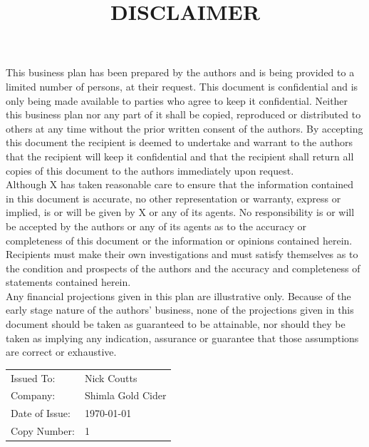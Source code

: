 \documentclass[11pt]{article}
\begin{document}
\title{DISCLAIMER}
\maketitle

\noindent This business plan has been prepared by the authors and is being provided to a limited number of persons, at their request. This document is confidential and is only being made available to parties who agree to keep it confidential. Neither this business plan nor any part of it shall be copied, reproduced or distributed to others at any time without the prior written consent of the authors. By accepting this document the recipient is deemed to undertake and warrant to the authors that the recipient will keep it confidential and that the recipient shall return all copies of this document to the authors immediately upon request. \\

\noindent Although X has taken reasonable care to ensure that the information contained in this document is accurate, no other representation or warranty, express or implied, is or will be given by X or any of its agents. No responsibility is or will be accepted by the authors or any of its agents as to the accuracy or completeness of this document or the information or opinions contained herein. Recipients must make their own investigations and must satisfy themselves as to the condition and prospects of the authors and the accuracy and completeness of statements contained herein. \\

\noindent Any financial projections given in this plan are illustrative only. Because of the early stage nature of the authors’ business, none of the projections given in this document should be taken as guaranteed to be attainable, nor should they be taken as implying any indication, assurance or guarantee that those assumptions are correct or exhaustive.
\vfill
\begin{table}[H]
\begin{center}
\begin{tabular}{| l l |}
\hline
Issued To:      &  Nick Coutts        \\
Company:        &  Shimla Gold Cider  \\
Date of Issue:  &  \today             \\
Copy Number:    &  1                  \\
\hline
\end{tabular}
\end{center}
\end{table}
\end{document}

